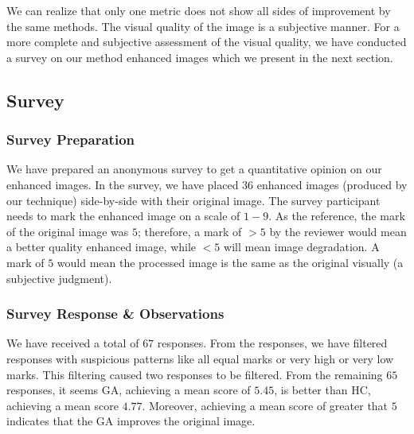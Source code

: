 We can realize that only one metric does not show all sides of improvement by the same methods. The visual quality of the image is a subjective manner. For a more complete and subjective assessment of the visual quality, we have conducted a survey on our method enhanced images which we present in the next section.

\subsection{Survey}
\label{subsection:exp_result_survey}


\subsubsection{Survey Preparation}
We have prepared an anonymous survey %
to get a quantitative opinion on our enhanced images. In the survey, we have placed $36$ enhanced images (produced by our technique) side-by-side with their original image. 
The survey participant needs to mark the enhanced image on a scale of $1-9$. As the reference, the mark of the original image was $5$; therefore, a mark of $>5$ by the reviewer would mean a better quality enhanced image, while $<5$ will mean image degradation. A mark of $5$ would mean the processed image is the same as the original visually (a subjective judgment). 

\subsubsection{Survey Response \& Observations}
We have received a total of $67$ responses. From the responses, we have filtered responses with suspicious patterns like all equal marks or very high or very low marks. This filtering caused two responses to be filtered. From the remaining $65$ responses, it seems GA, achieving a mean score of $5.45$, is better than HC, achieving a mean score $4.77$. 
Moreover, achieving a mean score of greater that $5$ indicates that the GA improves the original image.

